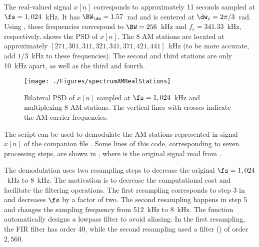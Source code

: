 The real-valued signal $x[n]$ corresponds to approximately 11 seconds sampled at $\fs=1,024$~kHz. It
has $\BW_{\dw} = 1.57$~rad and is centered at $\dw_c=2\pi/3$~rad. Using , these frequencies correspond to $\BW=256$~kHz and $f_c=341.33$~kHz, respectively.
 shows the PSD of $x[n]$. The 8 AM stations are located at
approximately 
$[271,  301,  311,  321,  341,  371, 421,  441]$~kHz (to be more accurate, add $1/3$~kHz to these frequencies). The second and third stations are only 10~kHz apart, as well as the third and
fourth.

\begin{figure}[htbp]
\centering
\texttt{[image: ./Figures/spectrumAMRealStations]}
\caption{Bilateral PSD of $x[n]$ sampled at $\fs=1,024$~kHz and  multiplexing 8 AM stations.
The vertical lines with
crosses indicate the AM carrier frequencies.\label{fig:spectrumAMRealStations}}
\end{figure}

The script  can be used to demodulate the AM stations represented in signal $x[n]$ of the companion file . Some lines of this code,
 corresponding to seven processing steps, are shown in ,
where   is the original signal read from .





The demodulation uses two resampling steps to decrease the original $\fs=1,024$~kHz to 
8~kHz. The motivation is to decrease the computational cost and
facilitate the filtering operations. The first resampling corresponds to step 3 in  and decreases $\fs$ by a factor of two. The second resampling
happens in step 5 and changes the sampling frequency from 512~kHz to 8~kHz. The function  automatically designs a lowpass filter to avoid aliasing. In the first resampling,
the FIR filter  has order 40, while the second resampling used a filter () of order $2,560$.

